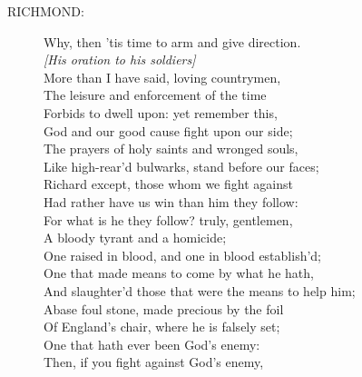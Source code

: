 \documentclass{article}
\begin{document}
\begin{description}
\item[RICHMOND:] 
\hspace{1pt}Why, then 'tis time to arm and give direction.\\
{\it [His oration to his soldiers]}\\
\hspace{1pt}More than I have said, loving countrymen,\\
\hspace{1pt}The leisure and enforcement of the time\\
\hspace{1pt}Forbids to dwell upon: yet remember this,\\
\hspace{1pt}God and our good cause fight upon our side;\\
\hspace{1pt}The prayers of holy saints and wronged souls,\\
\hspace{1pt}Like high-rear'd bulwarks, stand before our faces;\\
\hspace{1pt}Richard except, those whom we fight against\\
\hspace{1pt}Had rather have us win than him they follow:\\
\hspace{1pt}For what is he they follow?  truly, gentlemen,\\
\hspace{1pt}A bloody tyrant and a homicide;\\
\hspace{1pt}One raised in blood, and one in blood establish'd;\\
\hspace{1pt}One that made means to come by what he hath,\\
\hspace{1pt}And slaughter'd those that were the means to help him;\\
\hspace{1pt}Abase foul stone, made precious by the foil\\
\hspace{1pt}Of England's chair, where he is falsely set;\\
\hspace{1pt}One that hath ever been God's enemy:\\
\hspace{1pt}Then, if you fight against God's enemy,\\

\end{description}
\end{document}
